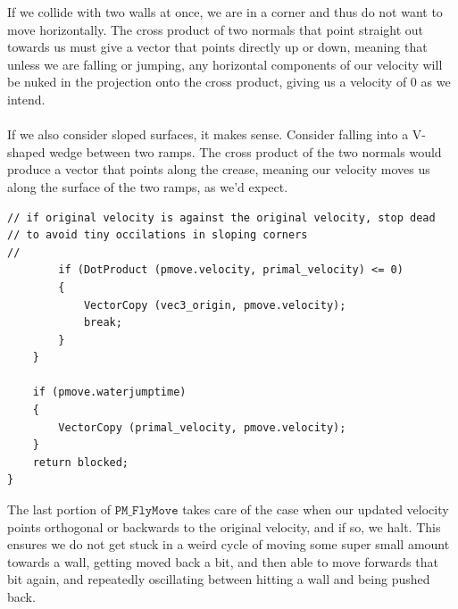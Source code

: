 \documentclass{article}
\begin{document}
If we collide with two walls at once, we are in a corner and thus do not want to move horizontally. The cross product of two normals that point straight out towards us must give a vector that points directly up or down, meaning that unless we are falling or jumping, any horizontal components of our velocity will be nuked in the projection onto the cross product, giving us a velocity of 0 as we intend. \\
\\
If we also consider sloped surfaces, it makes sense. Consider falling into a V-shaped wedge between two ramps. The cross product of the two normals would produce a vector that points along the crease, meaning our velocity moves us along the surface of the two ramps, as we'd expect. 
\begin{verbatim}
// if original velocity is against the original velocity, stop dead
// to avoid tiny occilations in sloping corners
//
		if (DotProduct (pmove.velocity, primal_velocity) <= 0)
		{
			VectorCopy (vec3_origin, pmove.velocity);
			break;
		}
	}

	if (pmove.waterjumptime)
	{
		VectorCopy (primal_velocity, pmove.velocity);
	}
	return blocked;
}
\end{verbatim}
The last portion of $\texttt{PM\_FlyMove}$ takes care of the case when our updated velocity points orthogonal or backwards to the original velocity, and if so, we halt. This ensures we do not get stuck in a weird cycle of moving some super small amount towards a wall, getting moved back a bit, and then able to move forwards that bit again, and repeatedly oscillating between hitting a wall and being pushed back. 
\end{document}
